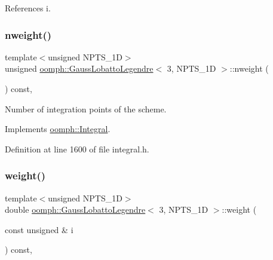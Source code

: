 References i.

\mbox{\label{classoomph_1_1GaussLobattoLegendre_3_013_00_01NPTS__1D_01_4_acdc8776b03b2308a687f800e6c1026bc}} 
\subsubsection{\texorpdfstring{nweight()}{nweight()}}
{\footnotesize\ttfamily template$<$unsigned N\+P\+T\+S\+\_\+1D$>$ \\
unsigned \hyperlink{classoomph_1_1GaussLobattoLegendre}{oomph\+::\+Gauss\+Lobatto\+Legendre}$<$ 3, N\+P\+T\+S\+\_\+1D $>$\+::nweight (\begin{DoxyParamCaption}{ }\end{DoxyParamCaption}) const\hspace{0.3cm}{\ttfamily [inline]}, {\ttfamily [virtual]}}



Number of integration points of the scheme. 



Implements \hyperlink{classoomph_1_1Integral_a1a270de9d99a1fcf1d25a6c1017f65fa}{oomph\+::\+Integral}.



Definition at line 1600 of file integral.\+h.

\mbox{\label{classoomph_1_1GaussLobattoLegendre_3_013_00_01NPTS__1D_01_4_a17845541ab33f080d323a445f189e095}} 
\subsubsection{\texorpdfstring{weight()}{weight()}}
{\footnotesize\ttfamily template$<$unsigned N\+P\+T\+S\+\_\+1D$>$ \\
double \hyperlink{classoomph_1_1GaussLobattoLegendre}{oomph\+::\+Gauss\+Lobatto\+Legendre}$<$ 3, N\+P\+T\+S\+\_\+1D $>$\+::weight (\begin{DoxyParamCaption}\item[{const unsigned \&}]{i }\end{DoxyParamCaption}) const\hspace{0.3cm}{\ttfamily [inline]}, {\ttfamily [virtual]}}



